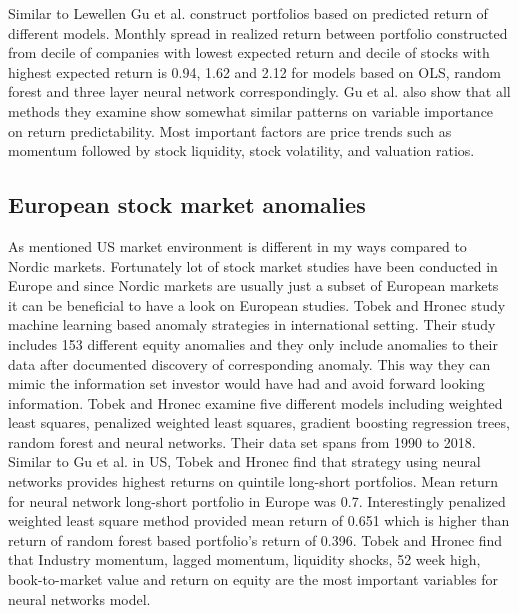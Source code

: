 \documentclass{article}
\begin{document}

Similar to Lewellen \citeyear{lewellen2015} Gu et al. construct portfolios based on predicted return of different models. Monthly spread in realized return between portfolio constructed from decile of companies with lowest expected return and decile of stocks with highest expected return \footnotemark is 0.94, 1.62 and 2.12 for models based on OLS, random forest and three layer neural network correspondingly. Gu et al. also show that all methods they examine show somewhat similar patterns on variable importance on return predictability. Most important factors are price trends such as momentum followed by stock liquidity, stock volatility, and valuation ratios.


\subsection{European stock market anomalies}

As mentioned US market environment is different in my ways compared to Nordic markets. Fortunately lot of stock market studies have been conducted in Europe and since Nordic markets are usually just a subset of European markets it can be beneficial to have a look on European studies. Tobek and Hronec \citeyear{TOBEK2021100588} study machine learning based anomaly strategies in international setting. Their study includes 153 different equity anomalies and they only include anomalies to their data after documented discovery of corresponding anomaly. This way they can mimic the information set investor would have had and avoid forward looking information. Tobek and Hronec examine five different models including weighted least squares, penalized weighted least squares, gradient boosting regression trees, random forest and neural networks. Their data set spans from 1990 to 2018. Similar to Gu et al. \citeyear{guetal} in US, Tobek and Hronec find that strategy using neural networks provides highest returns on quintile long-short portfolios. Mean return for neural network long-short portfolio in Europe was 0.7. Interestingly penalized weighted least square method provided mean return of 0.651 which is higher than return of random forest based portfolio's return of 0.396. Tobek and Hronec find that Industry momentum, lagged momentum, liquidity shocks, 52 week high, book-to-market value and return on equity are the most important variables for neural networks model.\footnotemark
\end{document}
